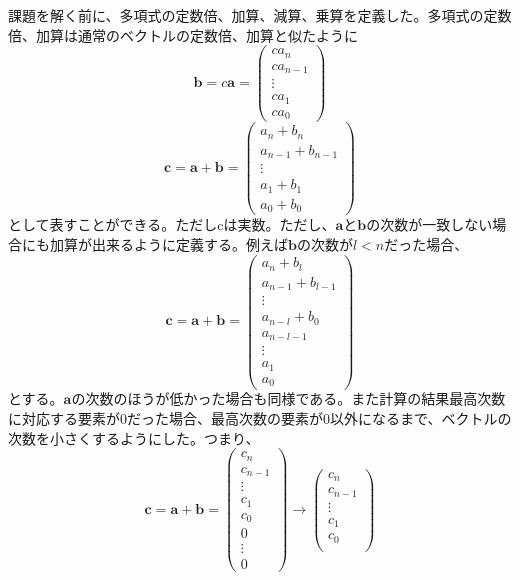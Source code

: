 \documentclass{jsarticle}
\begin{document}
課題を解く前に、多項式の定数倍、加算、減算、乗算を定義した。多項式の定数倍、加算は通常のベクトルの定数倍、加算と似たように
\begin{equation}
\bm{b} = c\bm{a} = 
\begin{pmatrix}
	ca_n \\
	ca_{n-1} \\
	\vdots \\
	ca_1 \\
	ca_0
\end{pmatrix}
\end{equation}
\begin{equation}
\bm{c} = \bm{a} + \bm{b} = 
\begin{pmatrix}
	a_n + b_n \\
	a_{n-1} + b_{n-1} \\
	\vdots \\
	a_1 + b_1 \\
	a_0 + b_0
\end{pmatrix}
\end{equation}
として表すことができる。ただしcは実数。ただし、$\bm{a}$と$\bm{b}$の次数が一致しない場合にも加算が出来るように定義する。例えば$\bm{b}$の次数が$l < n$だった場合、
\begin{equation}
\bm{c} = \bm{a} + \bm{b} = 
\begin{pmatrix}
	a_n + b_l \\
	a_{n-1} + b_{l-1} \\
	\vdots \\
	a_{n-l} + b_0 \\
	a_{n-l-1}\\
	\vdots \\
	a_1 \\
	a_0
\end{pmatrix}
\end{equation}
とする。$\bm{a}$の次数のほうが低かった場合も同様である。また計算の結果最高次数に対応する要素が0だった場合、最高次数の要素が0以外になるまで、ベクトルの次数を小さくするようにした。つまり、
\begin{equation}
\bm{c} = \bm{a} + \bm{b} = 
\begin{pmatrix}
	c_n \\
	c_{n-1} \\
	\vdots \\
	c_1 \\
	c_0 \\
	0 \\
	\vdots \\
	0
\end{pmatrix}
\to 
\begin{pmatrix}
	c_n \\
	c_{n-1} \\
	\vdots \\
	c_1 \\
	c_0 \\
\end{pmatrix}
\end{equation}
\end{document}
